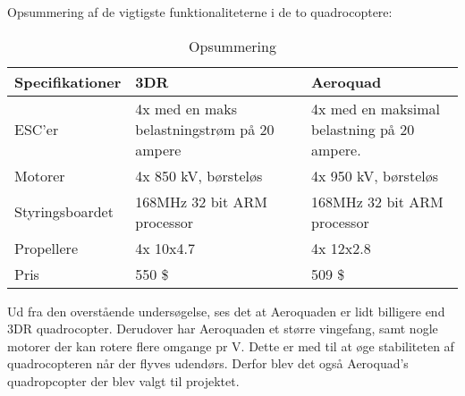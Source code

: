 Opsummering af de vigtigste funktionaliteterne i de to quadrocoptere:
\begin{table}[H]
	\centering
		\begin{tabular}{|p{3cm}|p{4 cm}|p{4 cm}|} 
		\hline
			\textbf{Specifikationer} & \textbf{3DR} 	& \textbf{Aeroquad} \\ \hline
					ESC'er &  4x med en maks belastningstrøm på 20 ampere				& 4x med en maksimal belastning på 20 ampere.	\\ \hline
			 		Motorer	& 4x 850 kV, børsteløs	& 4x 950 kV, børsteløs			\\ \hline
			 		Styringsboardet	& 168MHz 32 bit ARM processor				& 168MHz 32 bit ARM processor		\\ \hline
			 			Propellere & 4x 10x4.7 			& 4x 12x2.8					\\ \hline
			 			Pris & 	550 \$	& 509 \$				\\ \hline
		\end{tabular}
	\caption{Opsummering}
\end{table}

Ud fra den overstående undersøgelse, ses det at Aeroquaden er lidt billigere end 3DR quadrocopter. Derudover har Aeroquaden et større vingefang, samt nogle motorer der kan rotere flere omgange pr V. Dette er med til at øge stabiliteten af quadrocopteren når der flyves udendørs. Derfor blev det også Aeroquad's quadropcopter der blev valgt til projektet.

